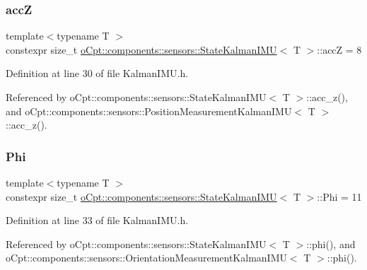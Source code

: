 \subsubsection{\texorpdfstring{accZ}{accZ}}
{\footnotesize\ttfamily template$<$typename T $>$ \\
constexpr size\+\_\+t \hyperlink{classo_cpt_1_1components_1_1sensors_1_1_state_kalman_i_m_u}{o\+Cpt\+::components\+::sensors\+::\+State\+Kalman\+I\+MU}$<$ T $>$\+::accZ = 8\hspace{0.3cm}{\ttfamily [static]}}



Definition at line 30 of file Kalman\+I\+M\+U.\+h.



Referenced by o\+Cpt\+::components\+::sensors\+::\+State\+Kalman\+I\+M\+U$<$ T $>$\+::acc\+\_\+z(), and o\+Cpt\+::components\+::sensors\+::\+Position\+Measurement\+Kalman\+I\+M\+U$<$ T $>$\+::acc\+\_\+z().

\hypertarget{classo_cpt_1_1components_1_1sensors_1_1_state_kalman_i_m_u_af40d1e1e859f609bb91173084ac42483}{}\label{classo_cpt_1_1components_1_1sensors_1_1_state_kalman_i_m_u_af40d1e1e859f609bb91173084ac42483} 
\subsubsection{\texorpdfstring{Phi}{Phi}}
{\footnotesize\ttfamily template$<$typename T $>$ \\
constexpr size\+\_\+t \hyperlink{classo_cpt_1_1components_1_1sensors_1_1_state_kalman_i_m_u}{o\+Cpt\+::components\+::sensors\+::\+State\+Kalman\+I\+MU}$<$ T $>$\+::Phi = 11\hspace{0.3cm}{\ttfamily [static]}}



Definition at line 33 of file Kalman\+I\+M\+U.\+h.



Referenced by o\+Cpt\+::components\+::sensors\+::\+State\+Kalman\+I\+M\+U$<$ T $>$\+::phi(), and o\+Cpt\+::components\+::sensors\+::\+Orientation\+Measurement\+Kalman\+I\+M\+U$<$ T $>$\+::phi().

\hypertarget{classo_cpt_1_1components_1_1sensors_1_1_state_kalman_i_m_u_ac4bdc3ef893341800a199f0072523d1f}{}\label{classo_cpt_1_1components_1_1sensors_1_1_state_kalman_i_m_u_ac4bdc3ef893341800a199f0072523d1f} 
